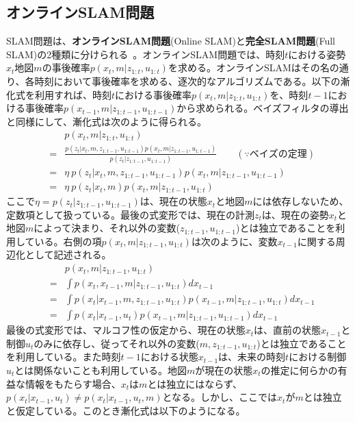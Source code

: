 \documentclass[dvipdfmx,a4paper]{jsarticle}
\begin{document}
\subsection{オンラインSLAM問題}
SLAM問題は、\textbf{オンラインSLAM問題}(Online SLAM)と\textbf{完全SLAM問題}(Full SLAM)の2種類に分けられる~\cite{Thrun07}\cite{Hara16}。オンラインSLAM問題では、時刻$t$における姿勢$x_t$地図$m$の事後確率$p(x_t, m | z_{1 : t}, u_{1 : t})$を求める。オンラインSLAMはその名の通り、各時刻において事後確率を求める、逐次的なアルゴリズムである。以下の漸化式を利用すれば、時刻$t$における事後確率$p(x_t, m | z_{1 : t}, u_{1 : t})$を、時刻$t - 1$における事後確率$p(x_{t - 1}, m | z_{1 : t - 1}, u_{1 : t - 1})$から求められる。ベイズフィルタの導出と同様にして、漸化式は次のように得られる。
\begin{eqnarray}
	&& p(x_t, m | z_{1 : t}, u_{1 : t}) \nonumber \\
	&=& \frac{p(z_t | x_t, m, z_{1 : t - 1}, u_{1 : t - 1}) p(x_t, m | z_{1 : t - 1}, u_{1 : t - 1})}{p(z_t | z_{1 : t - 1}, u_{1 : t - 1})} \qquad (\because ベイズの定理) \\
	&=& \eta \ p(z_t | x_t, m, z_{1 : t - 1}, u_{1 : t - 1}) p(x_t, m | z_{1 : t - 1}, u_{1 : t - 1}) \\
	&=& \eta \ p(z_t | x_t, m) p(x_t, m | z_{1 : t - 1}, u_{1 : t})
\end{eqnarray}
ここで$\eta = p(z_t | z_{1 : t - 1}, u_{1 : t - 1})$は、現在の状態$x_t$と地図$m$には依存しないため、定数項として扱っている。最後の式変形では、現在の計測$z_t$は、現在の姿勢$x_t$と地図$m$によって決まり、それ以外の変数($z_{1 : t - 1}, u_{1 : t - 1}$)とは独立であることを利用している。右側の項$p(x_t, m | z_{1 : t - 1}, u_{1 : t})$は次のように、変数$x_{t - 1}$に関する周辺化として記述される。
\begin{eqnarray}
	&& p(x_t, m | z_{1 : t - 1}, u_{1 : t}) \nonumber \\
	&=& \int p(x_t, x_{t - 1}, m | z_{1 : t - 1}, u_{1 : t}) dx_{t - 1} \\
	&=& \int p(x_t | x_{t - 1}, m, z_{1 : t - 1}, u_{1 : t}) p(x_{t - 1}, m | z_{1 : t - 1}, u_{1 : t}) dx_{t - 1} \\
	&=& \int p(x_t | x_{t - 1}, u_t) p(x_{t - 1}, m | z_{1 : t - 1}, u_{1 : t - 1}) dx_{t - 1}
\end{eqnarray}
最後の式変形では、マルコフ性の仮定から、現在の状態$x_t$は、直前の状態$x_{t - 1}$と制御$u_t$のみに依存し、従ってそれ以外の変数($m, z_{1 : t - 1}, u_{1 : t}$)とは独立であることを利用している。また時刻$t - 1$における状態$x_{t - 1}$は、未来の時刻$t$における制御$u_t$とは関係ないことも利用している。地図$m$が現在の状態$x_t$の推定に何らかの有益な情報をもたらす場合、$x_t$は$m$とは独立にはならず、$p(x_t | x_{t - 1}, u_t) \neq p(x_t | x_{t - 1}, u_t, m)$となる。しかし、ここでは$x_t$が$m$とは独立と仮定している。このとき漸化式は以下のようになる。
\end{document}
